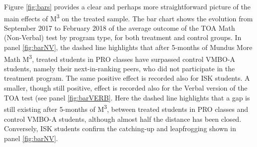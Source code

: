 \documentclass[ 12 pt]{article}
\begin{document}
 
 

Figure \ref{fig:bars} provides a clear and perhaps more straightforward picture of the main effects of M\textsuperscript{3} on the treated sample. The bar chart shows the evolution from September 2017 to February 2018 of the average outcome of the TOA Math (Non-Verbal) test by program type, for both treatment and control groups. In panel \ref{fig:barNV}, the dashed line highlights that after 5-months of Mundus More Math M\textsuperscript{3}, treated students in PRO classes have surpassed control VMBO-A students, namely their next-in-ranking peers, who did not participate in the treatment program. The same positive effect is recorded also for ISK students. A smaller, though still positive, effect is recorded also for the Verbal version of the TOA test (see panel \ref{fig:barVERB}. Here the dashed line highlights that a gap is still existing after 5-months of M\textsuperscript{3}, between treated students in PRO classes and control VMBO-A students, although almost half the distance has been closed. Conversely, ISK students confirm the catching-up and leapfrogging shown in panel \ref{fig:barNV}.
\end{document}
